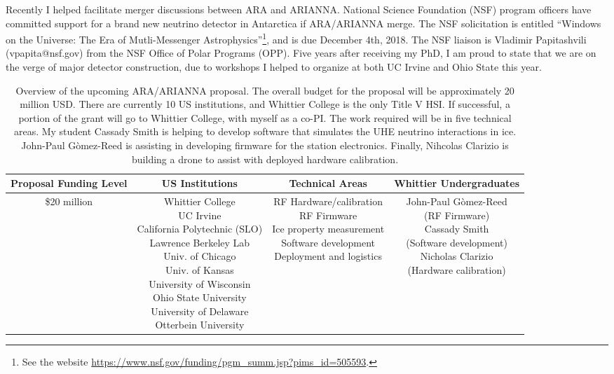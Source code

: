 \documentclass[../../main.tex]{subfiles}
\begin{document}
Recently I helped facilitate merger discussions between ARA and ARIANNA.  National Science Foundation (NSF) program officers have committed support for a brand new neutrino detector in Antarctica if ARA/ARIANNA merge.  The NSF solicitation is entitled ``Windows on the Universe: The Era of Mutli-Messenger Astrophysics''\footnote{See the website \url{https://www.nsf.gov/funding/pgm_summ.jsp?pims_id=505593}.}, and is due December 4th, 2018.  The NSF liaison is Vladimir Papitashvili (vpapita@nsf.gov) from the NSF Office of Polar Programs (OPP).  Five years after receiving my PhD, I am proud to state that we are on the verge of major detector construction, due to workshops I helped to organize at both UC Irvine and Ohio State this year. \\ \hspace{0.1cm}

\begin{table}[ht]
\centering
\begin{tabular}{|c|c|c|c|}
\hline
Proposal Funding Level & US Institutions & Technical Areas & Whittier Undergraduates \\ \hline \hline
\$20 million & \makecell{Whittier College \\ UC Irvine \\ California Polytechnic (SLO) \\ Lawrence Berkeley Lab \\ Univ. of Chicago \\ Univ. of Kansas \\ University of Wisconsin \\ Ohio State University \\ University of Delaware \\ Otterbein University} & \makecell{RF Hardware/calibration \\ RF Firmware \\ Ice property measurement \\ Software development \\ Deployment and logistics} & \makecell{John-Paul G\`{o}mez-Reed \\ (RF Firmware) \\ Cassady Smith \\ (Software development) \\ Nicholas Clarizio \\ (Hardware calibration)} \\ \hline
\end{tabular}
\caption{\label{tab:proposal} Overview of the upcoming ARA/ARIANNA proposal.  The overall budget for the proposal will be approximately 20 million USD.  There are currently 10 US institutions, and Whittier College is the only Title V HSI.  If successful, a portion of the grant will go to Whittier College, with myself as a co-PI.  The work required will be in five technical areas.  My student Cassady Smith is helping to develop software that simulates the UHE neutrino interactions in ice.  John-Paul G\`{o}mez-Reed is assisting in developing firmware for the station electronics.  Finally, Nihcolas Clarizio is building a drone to assist with deployed hardware calibration.}
\end{table}
\end{document}
